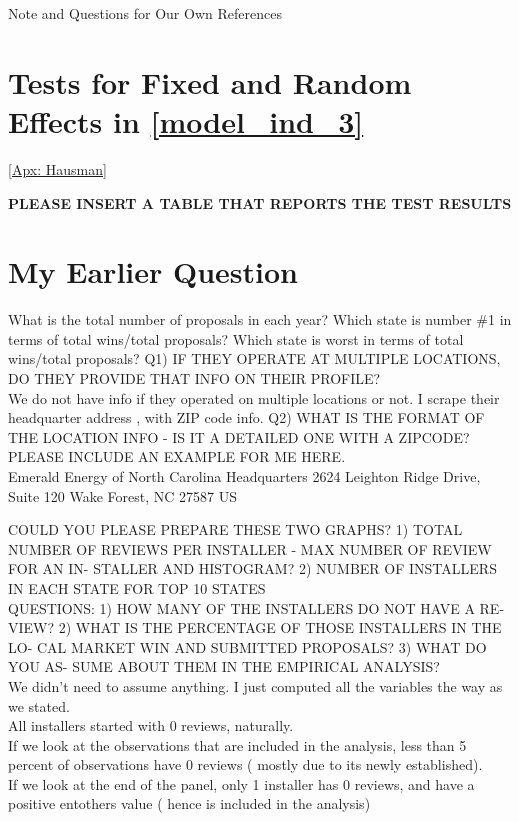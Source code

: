 \documentclass[msom,blindrev]{informs3}
\begin{document}
\begin{APPENDIX}{Note and Questions for Our Own References }

\section{Tests for Fixed and Random Effects in \eqref{model_ind_3}}\ref{Apx: Hausman}

\textbf{PLEASE INSERT A TABLE THAT REPORTS THE TEST RESULTS}



\section{My Earlier Question}

What is the total number of proposals in each year?
Which state is number \#1 in terms of total wins/total proposals?
Which state is worst in terms of total wins/total proposals?
Q1) IF THEY OPERATE AT MULTIPLE LOCATIONS, DO THEY PROVIDE
THAT INFO ON THEIR PROFILE? \\
We do not have info if they operated on multiple locations or not. I scrape their headquarter address , with ZIP code info.
Q2) WHAT IS THE FORMAT OF THE LOCATION INFO - IS IT A DETAILED
ONE WITH A ZIPCODE? PLEASE INCLUDE AN EXAMPLE FOR ME HERE. \\
Emerald Energy of North Carolina Headquarters
2624 Leighton Ridge Drive, Suite 120
Wake Forest, NC
27587 US

COULD YOU PLEASE PREPARE THESE TWO GRAPHS? 1) TOTAL NUMBER
OF REVIEWS PER INSTALLER - MAX NUMBER OF REVIEW FOR AN IN-
STALLER AND HISTOGRAM? 2) NUMBER OF INSTALLERS IN EACH STATE
FOR TOP 10 STATES \\
QUESTIONS: 1) HOW MANY OF THE INSTALLERS DO NOT HAVE A RE-
VIEW? 2) WHAT IS THE PERCENTAGE OF THOSE INSTALLERS IN THE LO-
CAL MARKET WIN AND SUBMITTED PROPOSALS? 3) WHAT DO YOU AS-
SUME ABOUT THEM IN THE EMPIRICAL ANALYSIS? \\
We didn't need to assume anything. I just computed all the variables the way as we stated. \\
All installers started with 0 reviews, naturally. \\
If we look at the observations that are included in the analysis, less than 5 percent of observations have 0 reviews ( mostly due to its newly established). \\
If we look at the end of the panel, only 1 installer has 0 reviews, and have a positive entothers value ( hence is included in the analysis)

\end{APPENDIX}
\end{document}
